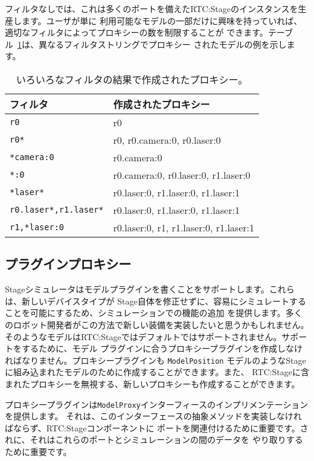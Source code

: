 \documentclass[a4paper,10pt]{article}
\newenvironment{Japanese}{%
  \CJKfamily{min}%
  \CJKtilde
  \CJKnospace}{}
\begin{document}
\begin{CJK}{UTF8}{}
\begin{Japanese}
フィルタなしでは、これは多くのポートを備えたRTC:Stageのインスタンスを生産します。ユーザが単に
利用可能なモデルの一部だけに興味を持っていれば、適切なフィルタによってプロキシーの数を制限することが
できます。テーブル~\ref{tab:filtered_proxies}は、異なるフィルタストリングでプロキシー
されたモデルの例を示します。

\begin{table}[t]
  \centering
  \begin{tabular}{ll}
    \toprule
    フィルタ & 作成されたプロキシー \\
    \midrule
    \verb|r0| & r0 \\
    \verb|r0*| & r0, r0.camera:0, r0.laser:0 \\
    \verb|*camera:0| & r0.camera:0 \\
    \verb|*:0| & r0.camera:0, r0.laser:0, r1.laser:0 \\
    \verb|*laser*| & r0.laser:0, r1.laser:0, r1.laser:1 \\
    \verb|r0.laser*,r1.laser*| & r0.laser:0, r1.laser:0, r1.laser:1 \\
    \verb|r1,*laser:0| & r0.laser:0, r1, r1.laser:0, r1.laser:1 \\
    \bottomrule
  \end{tabular}
  \caption{いろいろなフィルタの結果で作成されたプロキシー。}
  \label{tab:filtered_proxies}
\end{table}

\subsection{プラグインプロキシー}
\label{sec1:proxy-plugins}

Stageシミュレータはモデルプラグインを書くことをサポートします。これらは、新しいデバイスタイプが
Stage自体を修正せずに、容易にシミュレートすることを可能にするため、シミュレーションでの機能の追加
を提供します。多くのロボット開発者がこの方法で新しい装備を実装したいと思うかもしれません。
そのようなモデルはRTC:Stageではデフォルトではサポートされません。サポートをするために、モデル
プラグインに合うプロキシープラグインを作成しなければなりません。プロキシープラグインも
 \verb|ModelPosition| モデルのようなStageに組み込まれたモデルのために作成することができます。また、
RTC:Stageに含まれたプロキシーを無視する、新しいプロキシーも作成することができます。

プロキシープラグインは\verb|ModelProxy|インターフィースのインプリメンテーションを提供します。
それは、このインターフェースの抽象メソッドを実装しなければならず、RTC:Stageコンポーネントに
ポートを関連付けるために重要です。されに、それはこれらのポートとシミュレーションの間のデータを
やり取りするために重要です。


\end{Japanese}
\end{CJK}
\end{document}
